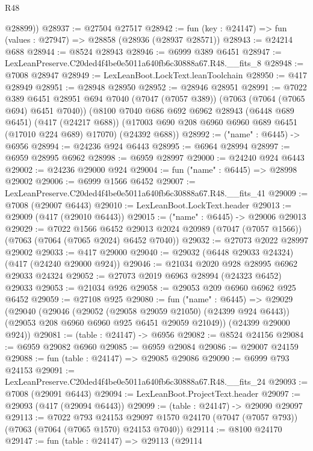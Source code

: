 \begin{lexlean}{R48}
\begin{coremodule}
        @28899))
@28937 := @27504 @27517
@28942 := fun (key : @24147) => fun (values : @27947) => @28858 (@28936 (@28937 @28571))
@28943 := @24214 @688
@28944 := @8524 @28943
@28946 := @6999 @389 @6451
@28947 := LexLeanPreserve.C20ded4f4be0e5011a640fb6c30888a67.R48.__fits_8
@28948 := @7008 @28947
@28949 := LexLeanBoot.LockText.leanToolchain
@28950 := @417 @28949
@28951 := @28948 @28950
@28952 := @28946 @28951
@28991 := @7022
    @389
    @6451
    @28951
    @694
    @7040
    (@7047 (@7057 @389))
    (@7063 (@7064 (@7065 @694) @6451 @7040))
    (@8100
      @7040
      @686
      @692
      @6962
      @28943
      (@6448 @689 @6451)
      (@417 (@24217 @688))
      (@17003 @690 @208 @6960 @6960 @689 @6451 (@17010 @224 @689) @17070)
      (@24392 @688))
@28992 := ("name" : @6445) -> @6956
@28994 := @24236 @924 @6443
@28995 := @6964 @28994
@28997 := @6959 @28995 @6962
@28998 := @6959 @28997
@29000 := @24240 @924 @6443
@29002 := @24236 @29000 @924
@29004 := fun ("name" : @6445) => @28998 @29002
@29006 := @6999 @1566 @6452
@29007 := LexLeanPreserve.C20ded4f4be0e5011a640fb6c30888a67.R48.__fits_41
@29009 := @7008 (@29007 @6443)
@29010 := LexLeanBoot.LockText.header
@29013 := @29009 (@417 (@29010 @6443))
@29015 := ("name" : @6445) -> @29006 @29013
@29029 := @7022
    @1566
    @6452
    @29013
    @2024
    @20989
    (@7047 (@7057 @1566))
    (@7063 (@7064 (@7065 @2024) @6452 @7040))
@29032 := @27073 @2022 @28997 @29002
@29033 := @417 @29000
@29040 := @29032 (@6448 @29033 @24324) (@417 (@24240 @29000 @924))
@29046 := @21034 @2020 @928 @28995 @6962 @29033 @24324
@29052 := @27073 @2019 @6963 @28994 (@24323 @6452) @29033
@29053 := @21034 @926
@29058 := @29053 @209 @6960 @6962 @925 @6452
@29059 := @27108 @925
@29080 := fun ("name" : @6445) =>
  @29029
    (@29040
      (@29046
        (@29052 (@29058 @29059 @21050) (@24399 @924 @6443))
        (@29053 @208 @6960 @6960 @925 @6451 @29059 @21049))
      (@24399 @29000 @924))
@29081 := (table : @24147) -> @6956
@29082 := @8524 @24156
@29084 := @6959 @29082 @6960
@29085 := @6959 @29084
@29086 := @29007 @24159
@29088 := fun (table : @24147) => @29085 @29086
@29090 := @6999 @793 @24153
@29091 := LexLeanPreserve.C20ded4f4be0e5011a640fb6c30888a67.R48.__fits_24
@29093 := @7008 (@29091 @6443)
@29094 := LexLeanBoot.ProjectText.header
@29097 := @29093 (@417 (@29094 @6443))
@29099 := (table : @24147) -> @29090 @29097
@29113 := @7022
    @793
    @24153
    @29097
    @1570
    @24170
    (@7047 (@7057 @793))
    (@7063 (@7064 (@7065 @1570) @24153 @7040))
@29114 := @8100 @24170
@29147 := fun (table : @24147) =>
  @29113
    (@29114

\end{coremodule}
\end{lexlean}
